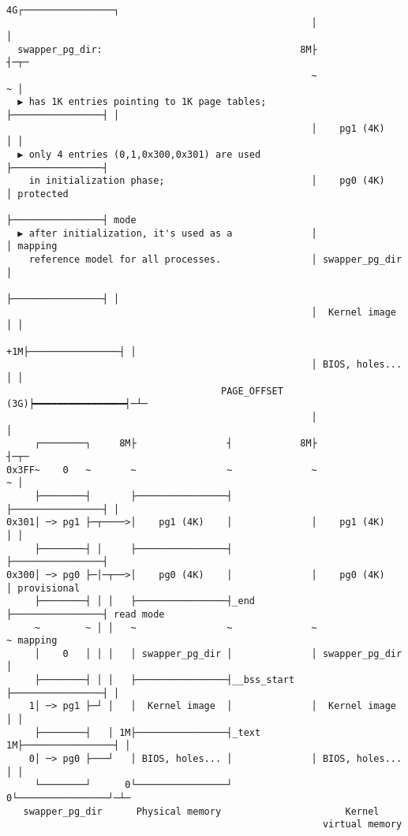 \documentclass[varwidth=70em]{standalone}
\begin{document}
\begin{verbatim}
                                                    4G┌────────────────┐
                                                      │                │
  swapper_pg_dir:                                   8M├                ┤─┬─
                                                      ~                ~ │
  ▶ has 1K entries pointing to 1K page tables;        ├────────────────┤ │
                                                      │    pg1 (4K)    │ │
  ▶ only 4 entries (0,1,0x300,0x301) are used         ├────────────────┤ 
    in initialization phase;                          │    pg0 (4K)    │ protected
                                                      ├────────────────┤ mode
  ▶ after initialization, it's used as a              │                │ mapping
    reference model for all processes.                │ swapper_pg_dir │ 
                                                      ├────────────────┤ │
                                                      │  Kernel image  │ │
                                                   +1M├────────────────┤ │
                                                      │ BIOS, holes... │ │
                                      PAGE_OFFSET (3G)┝━━━━━━━━━━━━━━━━┥─┴─
                                                      │                │
     ┌────────┐     8M├                ┤            8M├                ┤─┬─
0x3FF~    0   ~       ~                ~              ~                ~ │
     ├────────┤       ├────────────────┤              ├────────────────┤ │
0x301│ ─> pg1 ├─┬────>│    pg1 (4K)    │              │    pg1 (4K)    │ │
     ├────────┤ │     ├────────────────┤              ├────────────────┤ 
0x300│ ─> pg0 ├─│─┬──>│    pg0 (4K)    │              │    pg0 (4K)    │ provisional
     ├────────┤ │ │   ├────────────────┤_end          ├────────────────┤ read mode
     ~        ~ │ │   ~                ~              ~                ~ mapping
     │    0   │ │ │   │ swapper_pg_dir │              │ swapper_pg_dir │ 
     ├────────┤ │ │   ├────────────────┤__bss_start   ├────────────────┤ │
    1│ ─> pg1 ├─┘ │   │  Kernel image  │              │  Kernel image  │ │
     ├────────┤   │ 1M├────────────────┤_text       1M├────────────────┤ │
    0│ ─> pg0 ├───┘   │ BIOS, holes... │              │ BIOS, holes... │ │
     └────────┘      0└────────────────┘             0└────────────────┘─┴─
   swapper_pg_dir      Physical memory                      Kernel
                                                        virtual memory
\end{verbatim}
\end{document}
